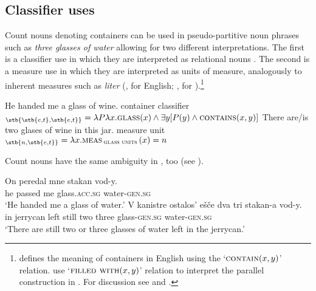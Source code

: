 \documentclass[output=paper]{langscibook}
\begin{document}
\subsection{Classifier uses}
Count nouns denoting containers can be used in pseudo-partitive noun phrases such as \textit{three glasses of water} allowing for two different interpretations. The first is a classifier use in which they are interpreted as relational nouns . The second is a measure use in which they are interpreted as units of measure, analogously to inherent measures such as \textit{liter}  (\citealt{Rothstein2009,Rothstein2017}, \citealt{Landman2004,Landman2016} for English; \citealt{Partee.Borschev2012}, \citealt{Khrizman2016,Khrizman2016b} for ).\footnote{\citet{Rothstein2009,Rothstein2017} defines the meaning of containers in English using the `$\textsc{contain}(x,y)$' relation. \citet{Partee.Borschev2012} use `$\textsc{filled with}(x,y)$' relation to interpret the parallel construction in . For discussion see \citet{Partee.Borschev2012} and \citet{Rothstein2017}.}

\ea\label{ex:khrizmann:27}
    \ea\label{ex:khrizmann:27a} He handed me a glass of wine. \hfill container classifier\\
    $_{\stb{\stb{e,t},\stb{e,t}}} = \lambda P \lambda x.\textsc{glass}(x) \wedge \exists y[P(y) \wedge \textsc{contains}(x,y)]$
    \ex\label{ex:khrizmann:27b} There are/is two glases of wine in this jar. \hfill measure unit\\
    $_{\stb{n,\stb{e,t}}} = \lambda x. \textsc{meas}\,_{\textsc{glass units}}\,(x) = n$
\z\z

\noindent Count nouns have the same ambiguity in , too  (see \citealt{Partee.Borschev2012,Khrizman.Rothstein2015,Khrizman2016,Khrizman2016b}).

\ea\label{ex:khrizmann:28}
    \ea \gll On peredal mne stakan vod-y.\\
    he passed me glass.\textsc{acc.sg} water-\textsc{gen.sg}\\
    \glt `He handed me a glass of water.'
    \ex \gll V kanistre ostalos' ešče dva tri stakan-a vod-y.\\
    in jerrycan left still two three glass-\textsc{gen.sg} water-\textsc{gen.sg}\\
    \glt `There are still two or three glasses of water left in the jerrycan.'
\z\z
\end{document}

